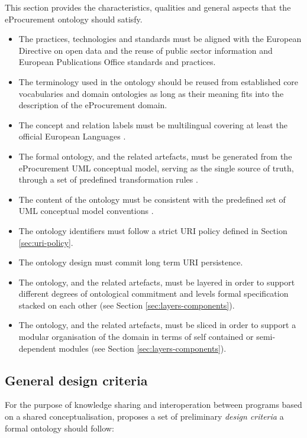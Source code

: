 	This section provides the characteristics, qualities and general aspects that the eProcurement ontology should satisfy.
	
	\begin{itemize}
		\item The practices, technologies and standards must be aligned with the European Directive on open data and the reuse of public sector information \citep{directive-2019/1024} and European Publications Office standards and practices.
		\item The terminology used in the ontology should be reused from established core vocabularies \cite{isaHandbook2015} and domain ontologies as long as their meaning fits into the description of the eProcurement domain.
		\item The concept and relation labels must be multilingual covering at least the official European Languages \cite{styleguide-eu}.
		\item The formal ontology, and the related artefacts, must be generated from the eProcurement UML conceptual model, serving as the single source of truth, through a set of predefined transformation rules \citep{costetchi2020c}. 
		\item The content of the ontology must be consistent with the predefined set of UML conceptual model conventions \cite{costetchi2020b}.
		\item The ontology identifiers must follow a strict URI policy defined in Section \ref{sec:uri-policy}.
		\item The ontology design must commit long term URI persistence.
		\item The ontology, and the related artefacts, must be layered in order to support different degrees of ontological commitment and levels formal specification stacked on each other (see Section \ref{sec:layers-components}).
		\item The ontology, and the related artefacts,  must be sliced in order to support a modular organisation of the domain in terms of self contained or semi-dependent modules (see Section \ref{sec:layers-components}).
	\end{itemize}
	
	\subsection{General design criteria}
	\label{sec:design-criteria}
	
	For the purpose of knowledge sharing and interoperation between programs based on a shared conceptualisation, \citet{gruber1995} proposes a set of preliminary \textit{design criteria} a formal ontology should follow:
	
